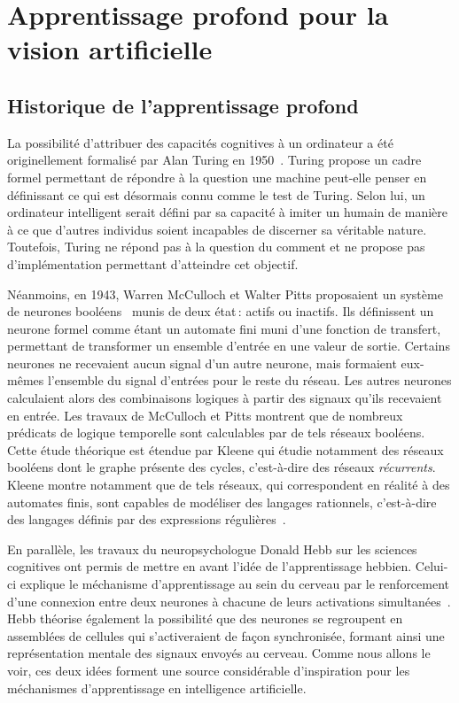 \section{Apprentissage profond pour la vision artificielle}

\subsection{Historique de l'apprentissage profond}

La possibilité d'attribuer des capacités cognitives à un ordinateur a été originellement formalisé par Alan Turing en 1950~\cite{turing_computing_1950}. Turing propose un cadre formel permettant de répondre à la question \og{} une machine peut-elle penser \fg{} en définissant ce qui est désormais connu comme le test de Turing. Selon lui, un ordinateur intelligent serait défini par sa capacité à imiter un humain de manière à ce que d'autres individus soient incapables de discerner sa véritable nature. Toutefois, Turing ne répond pas à la question du \og comment \fg{} et ne propose pas d'implémentation permettant d'atteindre cet objectif.

Néanmoins, en 1943, Warren McCulloch et Walter Pitts proposaient un système de neurones booléens~\cite{mcculloch_logical_1943} munis de deux état\,: actifs ou inactifs. Ils définissent un neurone formel comme étant un automate fini muni d'une fonction de transfert, permettant de transformer un ensemble d'entrée en une valeur de sortie. Certains neurones ne recevaient aucun signal d'un autre neurone, mais formaient eux-mêmes l'ensemble du signal d'entrées pour le reste du réseau. Les autres neurones calculaient alors des combinaisons logiques à partir des signaux qu'ils recevaient en entrée. Les travaux de McCulloch et Pitts montrent que de nombreux prédicats de logique temporelle sont calculables par de tels réseaux booléens. Cette étude théorique est étendue par Kleene qui étudie notamment des réseaux booléens dont le graphe présente des cycles, c'est-à-dire des réseaux \emph{récurrents}. Kleene montre notamment que de tels réseaux, qui correspondent en réalité à des automates finis, sont capables de modéliser des langages rationnels, c'est-à-dire des langages définis par des expressions régulières~\cite{kleene_representation_1956}.

En parallèle, les travaux du neuropsychologue Donald Hebb sur les sciences cognitives ont permis de mettre en avant l'idée de l'apprentissage hebbien. Celui-ci explique le méchanisme d'apprentissage au sein du cerveau par le renforcement d'une connexion entre deux neurones à chacune de leurs activations simultanées~\cite{hebb_organization_1949}. Hebb théorise également la possibilité que des neurones se regroupent en \og{} assemblées de cellules \fg{} qui s'activeraient de façon synchronisée, formant ainsi une représentation mentale des signaux envoyés au cerveau. Comme nous allons le voir, ces deux idées forment une source considérable d'inspiration pour les méchanismes d'apprentissage en intelligence artificielle.

